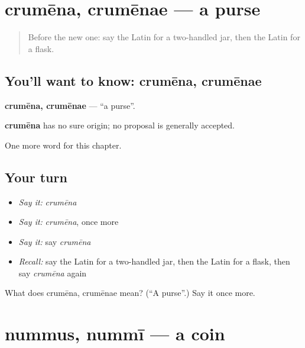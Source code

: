 \section[crumēna, crumēnae]{crumēna, crumēnae — a purse}

\label{lesson:LA-C123-crumena}



\begin{quote}
Before the new one: say the Latin for a two-handled jar, then the Latin for a flask.
\end{quote}

\subsection*{You'll want to know: crumēna, crumēnae}
\textbf{crumēna, crumēnae} — \textquotedblleft{}a purse\textquotedblright{}.

\begin{cousinweb}
\textbf{crumēna} has no sure origin; no proposal is generally accepted.
\end{cousinweb}

\begin{grammarlens}[title={What you've built}]
One more word for this chapter.
\end{grammarlens}

\subsection*{Your turn}
\begin{itemize}
\raggedright
  \item \emph{Say it:} \emph{crumēna}
  \item \emph{Say it:} \emph{crumēna}, once more
  \item \emph{Say it:} say \emph{crumēna}
  \item \emph{Recall:} say the Latin for a two-handled jar, then the Latin for a flask, then say \emph{crumēna} again
\end{itemize}

\begin{tcolorbox}[breakable,colback=teal!4,colframe=teal!35!black,title={Before you move on}]
What does crumēna, crumēnae mean? (\textquotedblleft{}A purse\textquotedblright{}.) Say it once more.
\end{tcolorbox}
\section[nummus, nummī]{nummus, nummī — a coin}


